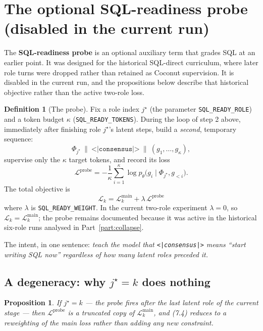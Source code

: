 \documentclass[11pt]{article}
\newtheorem{proposition}[theorem]{Proposition}
\theoremstyle{definition}
\newtheorem{definition}[theorem]{Definition}
\begin{document}
\section{The optional SQL-readiness probe (disabled in the current run)}
\label{sec:probe}

The \textbf{SQL-readiness probe} is an optional auxiliary term that grades SQL at an earlier point. It was designed for the historical SQL-direct curriculum, where later role turns were dropped rather than retained as Coconut supervision. It is disabled in the current run, and the propositions below describe that historical objective rather than the active two-role loss.

\begin{definition}[The probe]
\label{def:probe}
Fix a role index $j^\star$ (the parameter \texttt{SQL\_READY\_ROLE}) and a token budget $\kappa$ (\texttt{SQL\_READY\_TOKENS}). During the loop of step 2 above, immediately after finishing role $j^\star$'s latent steps, build a \emph{second}, temporary sequence:
\[
\Phi_{j^\star} \ \big\|\ \texttt{<|consensus|>} \ \big\|\ (g_1,\dots,g_\kappa),
\]
supervise only the $\kappa$ target tokens, and record its loss
\[
\mathcal{L}^{\mathrm{probe}}
= -\frac{1}{\kappa}\sum_{i=1}^{\kappa}\log p_\theta\big(g_i \mid \Phi_{j^\star}, g_{<i}\big).
\tag{7.3}
\]
The total objective is
\[
\boxed{\ \mathcal{L}_k = \mathcal{L}^{\mathrm{main}}_k + \lambda\,\mathcal{L}^{\mathrm{probe}}\ }
\tag{7.4}
\]
where $\lambda$ is \texttt{SQL\_READY\_WEIGHT}. In the current two-role experiment $\lambda=0$, so $\mathcal L_k=\mathcal L_k^{\mathrm{main}}$; the probe remains documented because it was active in the historical six-role runs analysed in Part~\ref{part:collapse}.
\end{definition}

The intent, in one sentence: \emph{teach the model that \texttt{<|consensus|>} means ``start writing SQL now'' regardless of how many latent roles preceded it.}

\subsection{A degeneracy: why $j^\star = k$ does nothing}
\label{sec:degenerate}

\begin{proposition}
\label{prop:probe-degenerate}
If $j^\star = k$ --- the probe fires after the \emph{last} latent role of the current stage --- then $\mathcal{L}^{\mathrm{probe}}$ is a truncated copy of $\mathcal{L}^{\mathrm{main}}_k$, and (7.4) reduces to a reweighting of the main loss rather than adding any new constraint.
\end{proposition}
\end{document}
